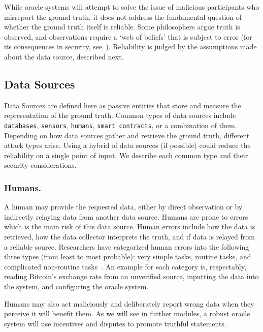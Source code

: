 While oracle systems will attempt to solve the issue of malicious participants who misreport the ground truth, it does not address the fundamental question of whether the ground truth itself is reliable. Some philosophers argue truth is observed, and observations require a `web of beliefs' that is subject to error (for its consequences in security, see~\cite{HvO17}). Reliability is judged by the assumptions made about the data source, described next. 


\subsection{Data Sources}\label{data_sources}

Data Sources are defined here as passive entities that store and measure the representation of the ground truth. Common types of data sources include \texttt{databases}, \texttt{sensors}, \texttt{humans}, \texttt{smart contracts}, or a combination of them. Depending on how data sources gather and retrieve the ground truth, different attack types arise. Using a hybrid of data sources (if possible) could reduce the reliability on a single point of input. We describe each common type and their security considerations.

\subsubsection{Humans.}\label{humansDatasource}
A human may provide the requested data, either by direct observation or by indirectly relaying data from another data source. Humans are prone to errors which is the main risk of this data source. Human errors include how the data is retrieved, how the data collector interprets the truth, and if data is relayed from a reliable source. Researchers have categorized human errors into the following three types (from least to most probable): very simple tasks, routine tasks, and complicated non-routine tasks~\cite{lo2020reliability}. An example for each category is, respectably, reading Bitcoin's exchange rate from an unverified source, inputting the data into the system, and configuring the oracle system.

Humans may also act maliciously and deliberately report wrong data when they perceive it will benefit them. As we will see in further modules, a robust oracle system will use incentives and disputes to promote truthful statements. 

